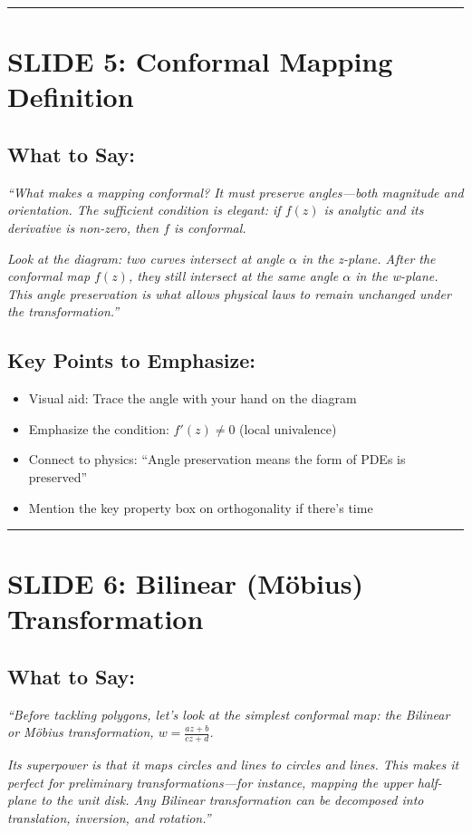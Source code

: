 \documentclass[12pt,a4paper]{article}
\begin{document}
\vspace{10pt}
\hrule
\vspace{10pt}

\section*{SLIDE 5: Conformal Mapping Definition}

\subsection*{What to Say:}
\begin{quotebox}
\textit{``What makes a mapping conformal? It must preserve angles---both magnitude and orientation. The sufficient condition is elegant: if $f(z)$ is analytic and its derivative is non-zero, then $f$ is conformal.}

\textit{Look at the diagram: two curves intersect at angle $\alpha$ in the z-plane. After the conformal map $f(z)$, they still intersect at the same angle $\alpha$ in the w-plane. This angle preservation is what allows physical laws to remain unchanged under the transformation.''}
\end{quotebox}

\subsection*{Key Points to Emphasize:}
\begin{itemize}[leftmargin=*]
    \item Visual aid: Trace the angle with your hand on the diagram
    \item Emphasize the condition: $f'(z) \neq 0$ (local univalence)
    \item Connect to physics: ``Angle preservation means the form of PDEs is preserved''
    \item Mention the key property box on orthogonality if there's time
\end{itemize}

\vspace{10pt}
\hrule
\vspace{10pt}

\section*{SLIDE 6: Bilinear (Möbius) Transformation}

\subsection*{What to Say:}
\begin{quotebox}
\textit{``Before tackling polygons, let's look at the simplest conformal map: the Bilinear or Möbius transformation, $w = \frac{az+b}{cz+d}$.}

\textit{Its superpower is that it maps circles and lines to circles and lines. This makes it perfect for preliminary transformations---for instance, mapping the upper half-plane to the unit disk. Any Bilinear transformation can be decomposed into translation, inversion, and rotation.''}
\end{quotebox}
\end{document}
